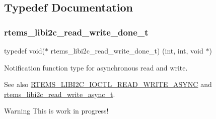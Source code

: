 \subsection{Typedef Documentation}
\mbox{\label{group__libi2c_gae9d3e463bdcf351a6d40952c9c57446c}} 
\subsubsection{\texorpdfstring{rtems\_libi2c\_read\_write\_done\_t}{rtems\_libi2c\_read\_write\_done\_t}}
{\footnotesize\ttfamily typedef void($\ast$ rtems\+\_\+libi2c\+\_\+read\+\_\+write\+\_\+done\+\_\+t) (int, int, void $\ast$)}



Notification function type for asynchronous read and write. 

\begin{DoxySeeAlso}{See also}
\mbox{\hyperlink{group__libi2c_gadae8be7dedd12dba0ca853f7f041fc1b}{R\+T\+E\+M\+S\+\_\+\+L\+I\+B\+I2\+C\+\_\+\+I\+O\+C\+T\+L\+\_\+\+R\+E\+A\+D\+\_\+\+W\+R\+I\+T\+E\+\_\+\+A\+S\+Y\+NC}} and \mbox{\hyperlink{structrtems__libi2c__read__write__async__t}{rtems\+\_\+libi2c\+\_\+read\+\_\+write\+\_\+async\+\_\+t}}.
\end{DoxySeeAlso}
\begin{DoxyWarning}{Warning}
This is work in progress! 
\end{DoxyWarning}
